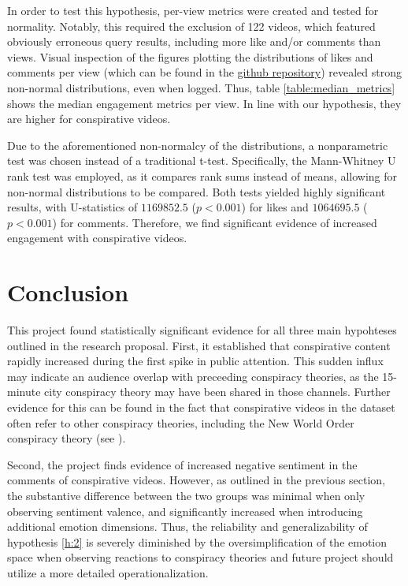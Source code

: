 \documentclass[fontsize=11pt, parskip=half]{scrartcl}
\begin{document}
    In order to test this hypothesis, per-view metrics were created and tested for normality. Notably, this required the exclusion of 122 videos, which featured obviously erroneous query results, including more like and/or comments than views. Visual inspection of the figures plotting the distributions of likes and comments per view (which can be found in the \href{https://github.com/julia-king-edu/so-24_smda_project}{github repository}) revealed strong non-normal distributions, even when logged. Thus, table \ref{table:median_metrics} shows the median engagement metrics per view. In line with our hypothesis, they are higher for conspirative videos.
    
    Due to the aforementioned non-normalcy of the distributions, a nonparametric test was chosen instead of a traditional t-test. Specifically, the Mann-Whitney U rank test was employed, as it compares rank sums instead of means, allowing for non-normal distributions to be compared. Both tests yielded highly significant results, with U-statistics of $1169852.5$ ($p < 0.001$) for likes and $1064695.5$ ($p < 0.001$) for comments. Therefore, we find significant evidence of increased engagement with conspirative videos.    

\section{Conclusion}
\label{section:conclusion}

    This project found statistically significant evidence for all three main hypohteses outlined in the research proposal. First, it established that conspirative content rapidly increased during the first spike in public attention. This sudden influx may indicate an audience overlap with preceeding conspiracy theories, as the 15-minute city conspiracy theory may have been shared in those channels. Further evidence for this can be found in the fact that conspirative videos in the dataset often refer to other conspiracy theories, including the New World Order conspiracy theory (see \cite{sparkConjuringOrderNew2000}). 

    Second, the project finds evidence of increased negative sentiment in the comments of conspirative videos. However, as outlined in the previous section, the substantive difference between the two groups was minimal when only observing sentiment valence, and significantly increased when introducing additional emotion dimensions. Thus, the reliability and generalizability of hypothesis \ref{h:2} is severely diminished by the oversimplification of the emotion space when observing reactions to conspiracy theories and future project should utilize a more detailed operationalization.
\end{document}
